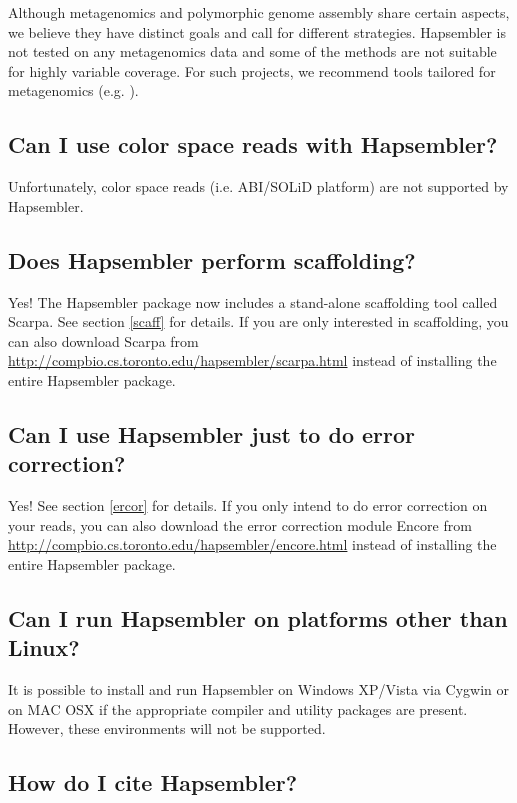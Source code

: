 \documentclass[12pt,a4paper]{report}
\begin{document}
Although metagenomics and polymorphic genome assembly share certain aspects, we believe they have distinct goals and call for different strategies. Hapsembler is not tested on any metagenomics data and some of the methods are not suitable for highly variable coverage. For such projects, we recommend tools tailored for metagenomics (e.g. \cite{laserson}).

\subsection{Can I use color space reads with Hapsembler?}

Unfortunately, color space reads (i.e. ABI/SOLiD platform) are not supported by Hapsembler.

\subsection{Does Hapsembler perform scaffolding?}

Yes! The Hapsembler package now includes a stand-alone scaffolding tool called Scarpa. See section \ref{scaff} for details. If you are only interested in scaffolding, you can also download Scarpa from \url{http://compbio.cs.toronto.edu/hapsembler/scarpa.html} instead of installing the entire Hapsembler package.

\subsection{Can I use Hapsembler just to do error correction?}

Yes! See section \ref{ercor} for details. If you only intend to do error correction on your reads, you can also download the error correction module Encore from \url{http://compbio.cs.toronto.edu/hapsembler/encore.html} instead of installing the entire Hapsembler package.

\subsection{Can I run Hapsembler on platforms other than Linux?}

It is possible to install and run Hapsembler on Windows XP/Vista via Cygwin or on MAC OSX if the appropriate compiler and utility packages are present. However, these environments will not be supported.

\subsection{How do I cite Hapsembler?}
\end{document}
